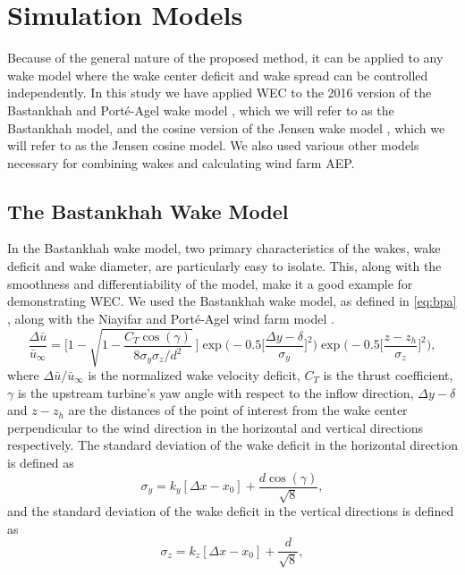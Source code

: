 \documentclass[journal abbreviation, manuscript]{copernicus}
\begin{document}
	\section{Simulation Models}\label{sec:models}
	Because of the general nature of the proposed method, it can be applied to any wake model where the wake center deficit and wake spread can be controlled independently. In this study we have applied WEC to the 2016 version of the Bastankhah and Port\'e-Agel wake model \cite{bastankhah2016}, which we will refer to as the Bastankhah model, and the cosine version of the Jensen wake model \cite{jensen1983}, which we will refer to as the Jensen cosine model. We also used various other models necessary for combining wakes and calculating wind farm AEP.
	
	\subsection{The Bastankhah Wake Model}
	In the Bastankhah wake model, two primary characteristics of the wakes, wake deficit and wake diameter, are particularly easy to isolate. This, along with the smoothness and differentiability of the model, make it a good example for demonstrating WEC. We used the Bastankhah wake model, as defined in \ref{eq:bpa} \cite{bastankhah2016}, along with the Niayifar and Port\'e-Agel wind farm model \cite{niayifar2016}.
	\begin{equation}
		\frac{\Delta \bar{u}}{\bar{u}_{\infty}} = \Bigg[1-\sqrt{1-\frac{C_T \cos{(\gamma)}}{8 \sigma_y \sigma_z/d^2}}~\Bigg] \exp{\bigg(-0.5\Big[\frac{\Delta y-\delta}{\sigma_y}\Big]^2\bigg)}\exp{\bigg(-0.5\Big[\frac{z-z_h}{\sigma_z}\Big]^2\bigg)},
		\label{eq:bpa}
	\end{equation}
	where $\Delta \bar{u} / \bar{u}_{\infty}$ is the normalized wake velocity deficit, $C_T$ is the thrust coefficient, $\gamma$ is the upstream turbine's yaw angle with respect to the inflow direction, $\Delta y-\delta$ and $z-z_h$ are the distances of the point of interest from the wake center perpendicular to the wind direction in the horizontal and vertical directions respectively. The standard deviation of the wake deficit in the horizontal direction is defined as
	\begin{equation}\label{eq:sigmay}
		\sigma_y = k_y [\Delta x - x_0] + \frac{d \cos{(\gamma)}}{\sqrt{8}},
	\end{equation}
	and the standard deviation of the wake deficit in the vertical directions is defined as
	\begin{equation}\label{eq:sigmaz}
		\sigma_z = k_z [\Delta x - x_0] + \frac{d}{\sqrt{8}},
	\end{equation}
\end{document}
